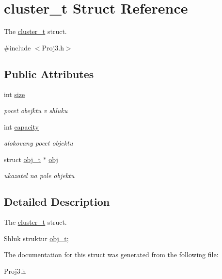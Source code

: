 \hypertarget{structcluster__t}{}\section{cluster\+\_\+t Struct Reference}
\label{structcluster__t}


The \hyperlink{structcluster__t}{cluster\+\_\+t} struct.  




{\ttfamily \#include $<$Proj3.\+h$>$}

\subsection*{Public Attributes}
\begin{DoxyCompactItemize}
\item 
\hypertarget{structcluster__t_ae1463905fc36c25032381b8e49359823}{}\label{structcluster__t_ae1463905fc36c25032381b8e49359823} 
int \hyperlink{structcluster__t_ae1463905fc36c25032381b8e49359823}{size}
\begin{DoxyCompactList}\small\item\em pocet obejktu v shluku \end{DoxyCompactList}\item 
\hypertarget{structcluster__t_acee92791a353de443b8a93e1a68e721f}{}\label{structcluster__t_acee92791a353de443b8a93e1a68e721f} 
int \hyperlink{structcluster__t_acee92791a353de443b8a93e1a68e721f}{capacity}
\begin{DoxyCompactList}\small\item\em alokovany pocet objektu \end{DoxyCompactList}\item 
\hypertarget{structcluster__t_a30eaceafae29d1a5b6f0fca36562c473}{}\label{structcluster__t_a30eaceafae29d1a5b6f0fca36562c473} 
struct \hyperlink{structobj__t}{obj\+\_\+t} $\ast$ \hyperlink{structcluster__t_a30eaceafae29d1a5b6f0fca36562c473}{obj}
\begin{DoxyCompactList}\small\item\em ukazatel na pole objektu \end{DoxyCompactList}\end{DoxyCompactItemize}


\subsection{Detailed Description}
The \hyperlink{structcluster__t}{cluster\+\_\+t} struct. 

Shluk struktur \hyperlink{structobj__t}{obj\+\_\+t}; 

The documentation for this struct was generated from the following file\+:\begin{DoxyCompactItemize}
\item 
Proj3.\+h\end{DoxyCompactItemize}
